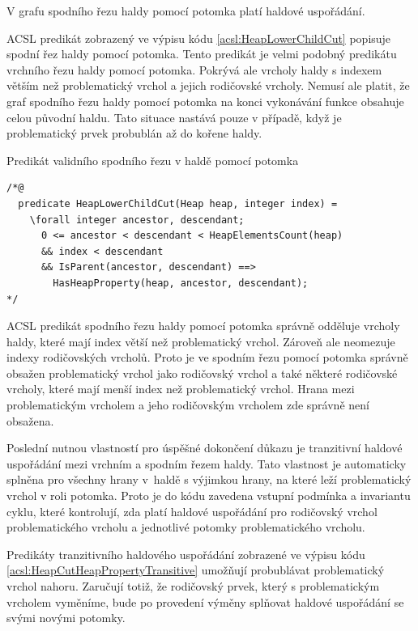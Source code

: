 \begin{remark}
	V grafu spodního řezu haldy pomocí potomka platí haldové uspořádání.
\end{remark}

ACSL predikát zobrazený ve výpisu kódu \ref{acsl:HeapLowerChildCut} popisuje spodní řez haldy pomocí potomka. Tento predikát je velmi podobný predikátu vrchního řezu haldy pomocí potomka. Pokrývá ale vrcholy haldy s indexem větším než problematický vrchol a jejich rodičovské vrcholy. Nemusí ale platit, že graf spodního řezu haldy pomocí potomka na konci vykonávání funkce obsahuje celou původní haldu. Tato situace nastává pouze v případě, když je problematický prvek probublán až do kořene haldy.

\begin{listing}[H]
	\caption{Predikát validního spodního řezu v haldě pomocí potomka}
	\label{acsl:HeapLowerChildCut}
	\begin{verbatim}
/*@
  predicate HeapLowerChildCut(Heap heap, integer index) =
    \forall integer ancestor, descendant;
      0 <= ancestor < descendant < HeapElementsCount(heap)
      && index < descendant
      && IsParent(ancestor, descendant) ==>
        HasHeapProperty(heap, ancestor, descendant);
*/
	\end{verbatim}
\end{listing}

ACSL predikát spodního řezu haldy pomocí potomka správně odděluje vrcholy haldy, které mají index větší než problematický vrchol. Zároveň ale neomezuje indexy rodičovských vrcholů. Proto je ve spodním řezu pomocí potomka správně obsažen problematický vrchol jako rodičovský vrchol a také některé rodičovské vrcholy, které mají menší index než problematický vrchol. Hrana mezi problematickým vrcholem a jeho rodičovským vrcholem zde správně není obsažena.

Poslední nutnou vlastností pro úspěšné dokončení důkazu je tranzitivní haldové uspořádání mezi vrchním a spodním řezem haldy. Tato vlastnost je automaticky splněna pro všechny hrany v~haldě s výjimkou hrany, na které leží problematický vrchol v roli potomka. Proto je do kódu zavedena vstupní podmínka a invariantu cyklu, které kontrolují, zda platí haldové uspořádání pro rodičovský vrchol problematického vrcholu a jednotlivé potomky problematického vrcholu.

Predikáty tranzitivního haldového uspořádání zobrazené ve výpisu kódu \ref{acsl:HeapCutHeapPropertyTransitive} umožňují probublávat problematický vrchol nahoru. Zaručují totiž, že rodičovský prvek, který s problematickým vrcholem vyměníme, bude po provedení výměny splňovat haldové uspořádání se svými novými potomky.

